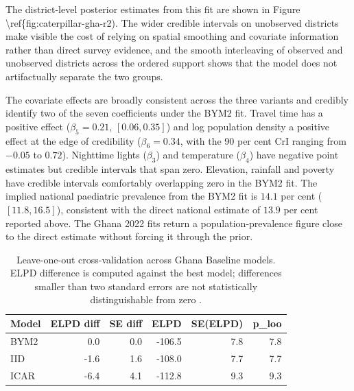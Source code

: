 \documentclass{article}
\begin{document}
The district-level posterior estimates from this fit are shown in Figure
\textbackslash ref\{fig:caterpillar-gha-r2). The wider credible
intervals on unobserved districts make visible the cost of relying on
spatial smoothing and covariate information rather than direct survey
evidence, and the smooth interleaving of observed and unobserved
districts across the ordered support shows that the model does not
artifactually separate the two groups.

The covariate effects are broadly consistent across the three variants
and credibly identify two of the seven coefficients under the BYM2 fit.
Travel time has a positive effect (\(\beta_5 = 0.21\), \([0.06, 0.35]\))
and log population density a positive effect at the edge of credibility
(\(\beta_6 = 0.34\), with the 90 per cent CrI ranging from \(-0.05\) to
\(0.72\)). Nighttime lights (\(\beta_3\)) and temperature (\(\beta_4\))
have negative point estimates but credible intervals that span zero.
Elevation, rainfall and poverty have credible intervals comfortably
overlapping zero in the BYM2 fit. The implied national paediatric
prevalence from the BYM2 fit is \(14.1\) per cent (\([11.8, 16.5]\)),
consistent with the direct national estimate of \(13.9\) per cent
reported above. The Ghana 2022 fits return a population-prevalence
figure close to the direct estimate without forcing it through the
prior.

\begingroup\fontsize{8}{10}\selectfont

\begin{longtable}[t]{lrrrrr}
\caption{\label{tab:cross-loo}Leave-one-out cross-validation across Ghana Baseline models. ELPD difference is computed against the best model; differences smaller than two standard errors are not statistically distinguishable from zero \citep{vehtari2017}. \label{tab:sens-loo}}\\
\toprule
Model & ELPD diff & SE diff & ELPD & SE(ELPD) & p\_loo\\
\midrule
BYM2 & 0.0 & 0.0 & -106.5 & 7.8 & 7.8\\
IID & -1.6 & 1.6 & -108.0 & 7.7 & 7.7\\
ICAR & -6.4 & 4.1 & -112.8 & 9.3 & 9.3\\
\bottomrule
\end{longtable}
\endgroup{}
\end{document}
